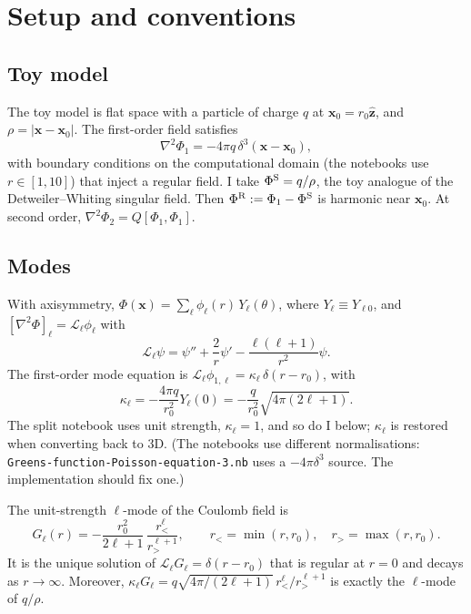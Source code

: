 \documentclass[11pt,a4paper]{article}
\newcommand{\Lop}{\mathcal{L}_\ell}
\newcommand{\PhiS}{\Phi^{\rm S}}
\newcommand{\PhiR}{\Phi^{\rm R}}
\newcommand{\x}{\mathbf{x}}
\newcommand{\nb}[1]{\nolinkurl{#1}}
\begin{document}
\section{Setup and conventions}

\subsection{Toy model}
The toy model is flat space with a particle of charge $q$ at $\x_0=r_0\hat{\mathbf z}$, and $\rho=|\x-\x_0|$.
The first-order field satisfies
\begin{equation}
\nabla^2\Phi_1=-4\pi q\,\delta^3(\x-\x_0),
\end{equation}
with boundary conditions on the computational domain (the notebooks use $r\in[1,10]$) that inject a regular field.
I take $\PhiS=q/\rho$, the toy analogue of the Detweiler--Whiting singular field.
Then $\PhiR:=\Phi_1-\PhiS$ is harmonic near $\x_0$.
At second order, $\nabla^2\Phi_2=Q[\Phi_1,\Phi_1]$.

\subsection{Modes}
With axisymmetry, $\Phi(\x)=\sum_\ell\phi_\ell(r)\,Y_\ell(\theta)$, where $Y_\ell\equiv Y_{\ell0}$, and $[\nabla^2\Phi]_\ell=\Lop\phi_\ell$ with
\begin{equation}
\Lop\psi=\psi''+\frac{2}{r}\psi'-\frac{\ell(\ell+1)}{r^2}\psi .
\end{equation}
The first-order mode equation is $\Lop\phi_{1,\ell}=\kappa_\ell\,\delta(r-r_0)$, with
\begin{equation}
\kappa_\ell=-\frac{4\pi q}{r_0^2}Y_\ell(0)=-\frac{q}{r_0^2}\sqrt{4\pi(2\ell+1)}.
\end{equation}
The split notebook uses unit strength, $\kappa_\ell=1$, and so do I below; $\kappa_\ell$ is restored when converting back to 3D.
(The notebooks use different normalisations: \nb{Greens-function-Poisson-equation-3.nb} uses a $-4\pi\delta^3$ source.
The implementation should fix one.)

The unit-strength $\ell$-mode of the Coulomb field is
\begin{equation}
G_\ell(r)=-\frac{r_0^2}{2\ell+1}\,\frac{r_<^\ell}{r_>^{\ell+1}},\qquad r_<=\min(r,r_0),\quad r_>=\max(r,r_0).
\label{eq:G}
\end{equation}
It is the unique solution of $\Lop G_\ell=\delta(r-r_0)$ that is regular at $r=0$ and decays as $r\to\infty$.
Moreover, $\kappa_\ell G_\ell=q\sqrt{4\pi/(2\ell+1)}\,r_<^\ell/r_>^{\ell+1}$ is exactly the $\ell$-mode of $q/\rho$.
\end{document}
